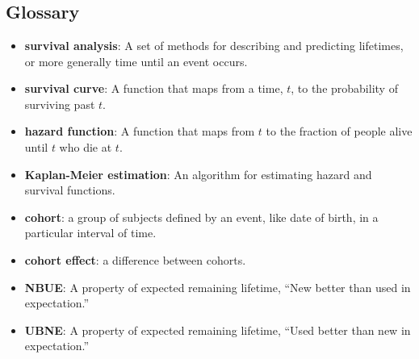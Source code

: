 

 \chapter{ }  \section*{Glossary} \begin{itemize}
	
	\item {\bf survival analysis}: A set of methods for describing and
	predicting lifetimes, or more generally time until an event occurs.
	
	\item {\bf survival curve}: A function that maps from a time, $t$, to the
	probability of surviving past $t$.
	
	\item {\bf hazard function}: A function that maps from $t$ to the fraction
	of people alive until $t$ who die at $t$.
	
	\item {\bf Kaplan-Meier estimation}: An algorithm for estimating hazard and
	survival functions.
	
	\item {\bf cohort}: a group of subjects defined by an event, like date of
	birth, in a particular interval of time.
	
	\item {\bf cohort effect}: a difference between cohorts.
	
	\item {\bf NBUE}: A property of expected remaining lifetime, ``New
	better than used in expectation.''
	
	\item {\bf UBNE}: A property of expected remaining lifetime, ``Used
	better than new in expectation.''
	
\end{itemize}



